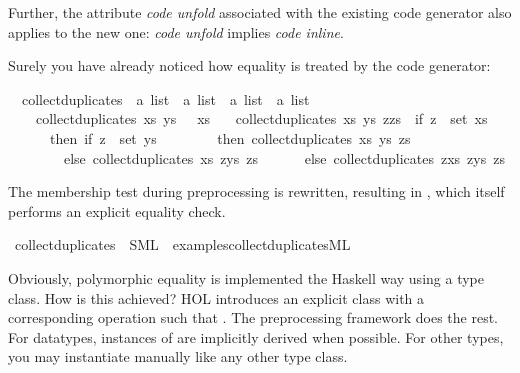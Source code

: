 \begin{isabellebody}
\begin{isamarkuptext}
\begin{warn}
    Further, the attribute \emph{code unfold}
    associated with the existing code generator also applies to
    the new one: \emph{code unfold} implies \emph{code inline}.
  \end{warn}%
\end{isamarkuptext}%
\isamarkuptrue%
%
\isamarkuptrue%
%
\begin{isamarkuptext}%
Surely you have already noticed how equality is treated
  by the code generator:%
\end{isamarkuptext}%
\isamarkuptrue%
\isamarkupfalse%
\isanewline
\ \ collect{\isacharunderscore}duplicates\ {\isacharcolon}{\isacharcolon}\ {\isachardoublequoteopen}{\isacharprime}a\ list\ {\isasymRightarrow}\ {\isacharprime}a\ list\ {\isasymRightarrow}\ {\isacharprime}a\ list\ {\isasymRightarrow}\ {\isacharprime}a\ list{\isachardoublequoteclose}\ \isanewline
\ \ \ \ {\isachardoublequoteopen}collect{\isacharunderscore}duplicates\ xs\ ys\ {\isacharbrackleft}{\isacharbrackright}\ {\isacharequal}\ xs{\isachardoublequoteclose}\isanewline
\ \ {\isacharbar}\ {\isachardoublequoteopen}collect{\isacharunderscore}duplicates\ xs\ ys\ {\isacharparenleft}z{\isacharhash}zs{\isacharparenright}\ {\isacharequal}\ {\isacharparenleft}if\ z\ {\isasymin}\ set\ xs\isanewline
\ \ \ \ \ \ then\ if\ z\ {\isasymin}\ set\ ys\isanewline
\ \ \ \ \ \ \ \ then\ collect{\isacharunderscore}duplicates\ xs\ ys\ zs\isanewline
\ \ \ \ \ \ \ \ else\ collect{\isacharunderscore}duplicates\ xs\ {\isacharparenleft}z{\isacharhash}ys{\isacharparenright}\ zs\isanewline
\ \ \ \ \ \ else\ collect{\isacharunderscore}duplicates\ {\isacharparenleft}z{\isacharhash}xs{\isacharparenright}\ {\isacharparenleft}z{\isacharhash}ys{\isacharparenright}\ zs{\isacharparenright}{\isachardoublequoteclose}%
\begin{isamarkuptext}%
The membership test during preprocessing is rewritten,
  resulting in , which itself
  performs an explicit equality check.%
\end{isamarkuptext}%
\isamarkuptrue%
\isamarkupfalse%
\ collect{\isacharunderscore}duplicates\ \ SML\ \ {\isachardoublequoteopen}examples{\isacharslash}collect{\isacharunderscore}duplicates{\isachardot}ML{\isachardoublequoteclose}%
\begin{isamarkuptext}%
%
\end{isamarkuptext}%
\isamarkuptrue%
%
\begin{isamarkuptext}%
Obviously, polymorphic equality is implemented the Haskell
  way using a type class.  How is this achieved?  HOL introduces
  an explicit class  with a corresponding operation
   such that .
  The preprocessing framework does the rest.
  For datatypes, instances of  are implicitly derived
  when possible.  For other types, you may instantiate 
  manually like any other type class.


\end{isamarkuptext}
\end{isabellebody}
